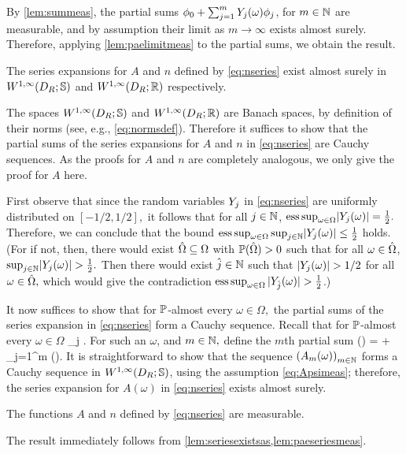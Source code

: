By \cref{lem:summeas}, the partial sums $\phi_0 + \sum_{j=1}^m Y_{j}(\omega)\phi_j$, for $m \in \mathbb N$ are measurable, and by assumption their limit as $m \rightarrow \infty$ exists almost surely. Therefore, applying \cref{lem:paelimitmeas} to the partial sums, we obtain the result.
\epf

\ble\label{lem:seriesexistsas}
The series expansions for $A$ and $n$ defined by \eqref{eq:nseries} exist almost surely in $\WoiDRRRdtd$ and $\WoiDRRR$ respectively.
\ele

The spaces $\WoiDRRRdtd$ and $\WoiDRRR$ are Banach spaces, by definition of their norms (see, e.g., \eqref{eq:normsdef}). Therefore it suffices to show that the partial sums of the series expansions for $A$ and $n$ in \eqref{eq:nseries} are Cauchy sequences. As the proofs for $A$ and $n$ are completely analogous, we only give the proof for $A$ here.

First observe that since the random variables $Y_{j}$ in \eqref{eq:nseries} are uniformly distributed on $[-1/2,1/2],$ it follows that for all $j \in \mathbb N$, $\esssup_{\omega \in \Omega} \abs{\Yj(\omega)} = \frac12.$
Therefore, we can conclude that the bound $\esssup_{\omega \in \Omega} \sup_{j \in \NN} \abs{\Yj(\omega)} \leq \half$ holds.
(For if not, then, there would exist $\hat{\Omega} \subseteq \Omega$ with $\mathbb P(\hat{\Omega}) > 0$ such that for all $\omega \in \hat{\Omega}$, $\sup_{j \in \NN} \abs{\Yj(\omega)} > \half.$
Then there would exist $\hat{j} \in \mathbb N$ such that $\abs{\Yj(\omega)} > 1/2$ for all $\omega \in \hat{\Omega},$ which would give the contradiction $\operatorname{ess\,sup}_{\omega \in \Omega} |Y_{\hat{j}}(\omega)| > \frac{1}{2}$.)

It now suffices to show that for $\mathbb P$-almost every $\omega \in \Omega,$ the partial sums of the series expansion in \eqref{eq:nseries} form a Cauchy sequence. Recall that for $\mathbb P$-almost every $\omega \in \Omega$
\beqs
\sup_{j \in \NN} \abs{\Yj(\omega)} \leq \half.
\eeqs
For such an $\omega$, and $m \in \mathbb N,$ define the $m$th partial sum
\beqs
\Am(\omega) = \Az + \sum_{j=1}^m \Yj(\omega)\Psij.
\eeqs
It is straightforward to show that the sequence $\mleft(\Am(\omega)\mright)_{m \in \NN}$ forms a Cauchy sequence in $\WoiDRRRdtd$, using the assumption \eqref{eq:Apsimeas}; therefore, the series expansion for $A(\omega)$ in \eqref{eq:nseries} exists almost surely.
\epf

\ble\label{lem:seriesmeas}
The functions $A$ and $n$ defined by \eqref{eq:nseries} are measurable.
\ele

The result immediately follows from \cref{lem:seriesexistsas,lem:paeseriesmeas}.
\epf
